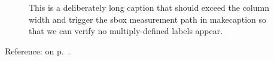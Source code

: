 \documentclass{article}
\begin{document}
\begin{figure}
  \caption{This is a deliberately long caption that should exceed the
    column width and trigger the sbox measurement path in makecaption
    so that we can verify no multiply-defined labels appear.
    }
\end{figure}

Reference:  on p.~\pageref{zebra:long}.

\end{document}
